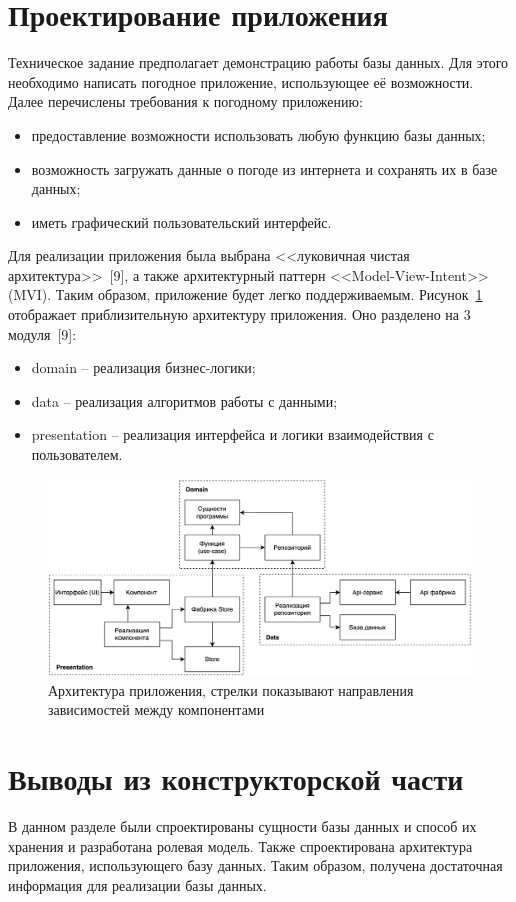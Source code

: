 \section{Проектирование приложения}
Техническое задание предполагает демонстрацию работы базы данных.
Для этого необходимо написать погодное приложение, использующее её возможности.
Далее перечислены требования к погодному приложению:
\begin{itemize}
    \item
        предоставление возможности использовать любую функцию базы данных;
    \item
        возможность загружать данные о погоде из интернета и сохранять их в базе данных;
    \item иметь графический пользовательский интерфейс.
\end{itemize}

Для реализации приложения была выбрана <<луковичная чистая архитектура>>~[9], а также архитектурный паттерн <<Model-View-Intent>> (MVI).
Таким образом, приложение будет легко поддерживаемым.
Рисунок~\ref{fig:component} отображает приблизительную архитектуру приложения.
Оно разделено на 3 модуля~[9]:
\begin{itemize}
    \item domain -- реализация бизнес-логики;
    \item data -- реализация алгоритмов работы с данными;
    \item presentation -- реализация интерфейса и логики взаимодействия с пользователем.
\end{itemize}

\begin{figure}[H]
	\centering
	\includegraphics[height=0.3\textheight, width=\textwidth]{tools/img/component.png}
	\caption{
        Архитектура приложения, стрелки показывают направления зависимостей между компонентами
    }
	\label{fig:component}
\end{figure}

\section*{Выводы из конструкторской части}
В данном разделе были спроектированы сущности базы данных и способ их хранения и разработана ролевая модель.
Также спроектирована архитектура приложения, использующего базу данных.
Таким образом, получена достаточная информация для реализации базы данных.